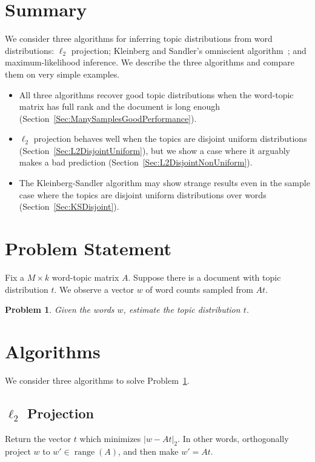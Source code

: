 \documentclass{article}
\DeclareMathOperator{\Range}{range}
\newtheorem{Problem}{Problem}
\begin{document}
\section{Summary}

We consider three algorithms for inferring topic distributions from word distributions:
    \(\ell_2\) projection; Kleinberg and Sandler's omniscient algorithm~\cite{kleinberg2004using}; and maximum-likelihood inference.
We describe the three algorithms and compare them on very simple examples.
\begin{itemize}
\item All three algorithms recover good topic distributions when the word-topic matrix has full rank and the document is long enough (Section~\ref{Sec:ManySamplesGoodPerformance}).
\item \(\ell_2\) projection behaves well when the topics are disjoint uniform distributions (Section~\ref{Sec:L2DisjointUniform}), but we show a case where it arguably makes a bad prediction (Section~\ref{Sec:L2DisjointNonUniform}).
\item The Kleinberg-Sandler algorithm may show strange results even in the sample case where the topics are disjoint uniform distributions over words (Section~\ref{Sec:KSDisjoint}).
\end{itemize}

\section{Problem Statement}

Fix a \(M \times k\) word-topic matrix \(A\).
Suppose there is a document with topic distribution \(t\).
We observe a vector \(w\) of word counts sampled from \(At\).
\begin{Problem}
    \label{Problem:InferTopics}
    Given the words \(w\), estimate the topic distribution \(t\).
\end{Problem}

\section{Algorithms}

We consider three algorithms to solve Problem~\ref{Problem:InferTopics}.

\subsection{\(\ell_2\) Projection}

Return the vector \(t\) which minimizes \(|w - A t|_2\).
In other words, orthogonally project \(w\) to \(w' \in \Range(A)\), and then make \(w' = A t\).
\end{document}
